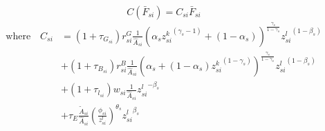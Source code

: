 \begin{equation*}
	C(\bar{F}_{si}) = C_{si} \bar{F}_{si} 
	\end{equation*}
	\begin{equation*}
		\begin{split}
			\text{where} \quad C_{si}  &  = (1+ \tau_{G_{si}}) r^{G}_{si} \frac{1}{\hat{A}_{si}} \left(
				\alpha_s {z_{si}^k}^{(\gamma_s-1)} + (1-\alpha_s)
			\right)^{\frac{\gamma_s}{1-\gamma_s}} {z_{si}^l}^{(1-\beta_s)} \\
			& + (1+ \tau_{B_{si}})r^{B}_{si}\frac{1}{\hat{A}_{si}} \left(
				\alpha_s  + (1-\alpha_s){z^k_{si}}^{(1-\gamma_s )}
			\right)^{\frac{\gamma_s}{1-\gamma_s}} {z_{si}^l}^{(1-\beta_s)}\\
			& + (1+ \tau_{l_{si}}) w_{si} \frac{1}{\hat{A}_{si}}  {z_{si}^l}^{-\beta_s}\\
			 & + \tau_{E} \frac{\tilde{A}_{si}}{\hat{A}_{si}}(\frac{\phi_{si}}{z^{l}_{si}})^{\theta_s} {z^{l}_{si}}^{\beta_s}
		\end{split}
	\end{equation*}